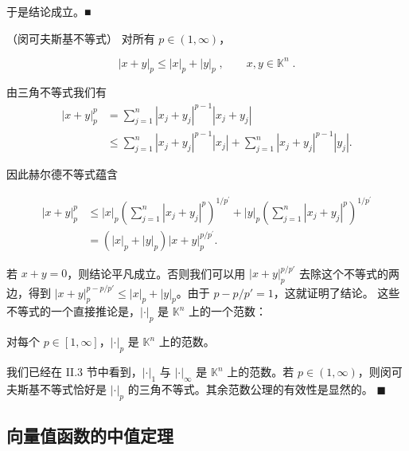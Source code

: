 \begin{application}
\begin{items}
于是结论成立。■

\item

（闵可夫斯基不等式） 对所有 $ p \in (1, \infty) $，

\[
|x+y|_{p}\leq|x|_{p}+|y|_{p}\;,\qquad x,y\in\mathbb{K}^{n}\;.
\]

\proofhead
由三角不等式我们有
\begin{equation*}
\begin{aligned}
\left|x+y\right|_{p}^{p}&=\sum_{j=1}^{n}\left|x_{j}+y_{j}\right|^{p-1}\left|x_{j}+y_{j}\right|\\&\leq\sum_{j=1}^{n}\left|x_{j}+y_{j}\right|^{p-1}\left|x_{j}\right|+\sum_{j=1}^{n}\left|x_{j}+y_{j}\right|^{p-1}\left|y_{j}\right|.
\end{aligned}
\end{equation*}

因此赫尔德不等式蕴含

\begin{equation*}
\begin{aligned}
|x+y|^{p}_{p}&\leq|x|_{p}\left(\sum^{n}_{j=1}|x_{j}+y_{j}|^{p}\right)^{1/p^{\prime}}+|y|_{p}\left(\sum^{n}_{j=1}|x_{j}+y_{j}|^{p}\right)^{1/p^{\prime}}\\&=\left(|x|_{p}+|y|_{p}\right)|x+y|^{p/p^{\prime}}_{p}.
\end{aligned}
\end{equation*}

若 $x + y = 0$，则结论平凡成立。否则我们可以用 $|x + y|_{p}^{p/p'}$ 去除这个不等式的两边，得到 $|x + y|_{p}^{p-p/p'} \leq |x|_{p} + |y|_{p}$。由于 $p - p/p' = 1$，这就证明了结论。
这些不等式的一个直接推论是，$ |\cdot|_{p} $ 是 $ \mathbb{K}^{n} $ 上的一个范数：

\end{items}

\end{application}

\begin{proposition}

对每个 $p \in [1, \infty]$，$|\cdot|_{p}$ 是 $\mathbb{K}^{n}$ 上的范数。

\proofhead
我们已经在 II.3 节中看到，$ |\cdot|_{1} $ 与 $ |\cdot|_{\infty} $ 是 $ \mathbb{K}^{n} $ 上的范数。若 $ p \in (1, \infty) $，则闵可夫斯基不等式恰好是 $ |\cdot|_{p} $ 的三角不等式。其余范数公理的有效性是显然的。 $ \blacksquare $
\end{proposition}

\subsection*{向量值函数的中值定理}

